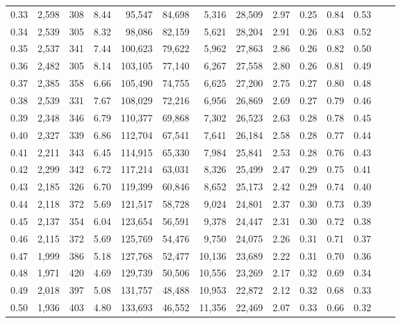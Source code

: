 \begin{tabular}{rrrrrrrrrrrrrr}
0.33 &  2,598 &  308 &    8.44 &   95,547 &   84,698 &   5,316 &  28,509 &  2.97 &  0.25 &  0.84 &      0.53 \\
0.34 &  2,539 &  305 &    8.32 &   98,086 &   82,159 &   5,621 &  28,204 &  2.91 &  0.26 &  0.83 &      0.52 \\
0.35 &  2,537 &  341 &    7.44 &  100,623 &   79,622 &   5,962 &  27,863 &  2.86 &  0.26 &  0.82 &      0.50 \\
0.36 &  2,482 &  305 &    8.14 &  103,105 &   77,140 &   6,267 &  27,558 &  2.80 &  0.26 &  0.81 &      0.49 \\
0.37 &  2,385 &  358 &    6.66 &  105,490 &   74,755 &   6,625 &  27,200 &  2.75 &  0.27 &  0.80 &      0.48 \\
0.38 &  2,539 &  331 &    7.67 &  108,029 &   72,216 &   6,956 &  26,869 &  2.69 &  0.27 &  0.79 &      0.46 \\
0.39 &  2,348 &  346 &    6.79 &  110,377 &   69,868 &   7,302 &  26,523 &  2.63 &  0.28 &  0.78 &      0.45 \\
0.40 &  2,327 &  339 &    6.86 &  112,704 &   67,541 &   7,641 &  26,184 &  2.58 &  0.28 &  0.77 &      0.44 \\
0.41 &  2,211 &  343 &    6.45 &  114,915 &   65,330 &   7,984 &  25,841 &  2.53 &  0.28 &  0.76 &      0.43 \\
0.42 &  2,299 &  342 &    6.72 &  117,214 &   63,031 &   8,326 &  25,499 &  2.47 &  0.29 &  0.75 &      0.41 \\
0.43 &  2,185 &  326 &    6.70 &  119,399 &   60,846 &   8,652 &  25,173 &  2.42 &  0.29 &  0.74 &      0.40 \\
0.44 &  2,118 &  372 &    5.69 &  121,517 &   58,728 &   9,024 &  24,801 &  2.37 &  0.30 &  0.73 &      0.39 \\
0.45 &  2,137 &  354 &    6.04 &  123,654 &   56,591 &   9,378 &  24,447 &  2.31 &  0.30 &  0.72 &      0.38 \\
0.46 &  2,115 &  372 &    5.69 &  125,769 &   54,476 &   9,750 &  24,075 &  2.26 &  0.31 &  0.71 &      0.37 \\
0.47 &  1,999 &  386 &    5.18 &  127,768 &   52,477 &  10,136 &  23,689 &  2.22 &  0.31 &  0.70 &      0.36 \\
0.48 &  1,971 &  420 &    4.69 &  129,739 &   50,506 &  10,556 &  23,269 &  2.17 &  0.32 &  0.69 &      0.34 \\
0.49 &  2,018 &  397 &    5.08 &  131,757 &   48,488 &  10,953 &  22,872 &  2.12 &  0.32 &  0.68 &      0.33 \\
0.50 &  1,936 &  403 &    4.80 &  133,693 &   46,552 &  11,356 &  22,469 &  2.07 &  0.33 &  0.66 &      0.32 \\

\end{tabular}
